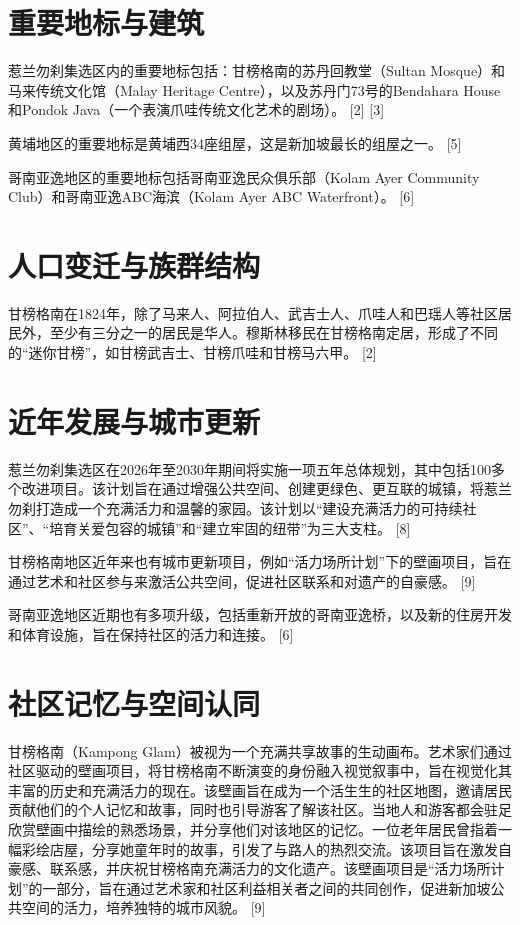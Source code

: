 \documentclass[11pt,a4paper,twoside,openany]{book}
\begin{document}
\section{重要地标与建筑}
惹兰勿刹集选区内的重要地标包括：甘榜格南的苏丹回教堂（Sultan Mosque）和马来传统文化馆（Malay Heritage Centre），以及苏丹门73号的Bendahara House和Pondok Java（一个表演爪哇传统文化艺术的剧场）。 [2] [3]

黄埔地区的重要地标是黄埔西34座组屋，这是新加坡最长的组屋之一。 [5]

哥南亚逸地区的重要地标包括哥南亚逸民众俱乐部（Kolam Ayer Community Club）和哥南亚逸ABC海滨（Kolam Ayer ABC Waterfront）。 [6]

\section{人口变迁与族群结构}
甘榜格南在1824年，除了马来人、阿拉伯人、武吉士人、爪哇人和巴瑶人等社区居民外，至少有三分之一的居民是华人。穆斯林移民在甘榜格南定居，形成了不同的“迷你甘榜”，如甘榜武吉士、甘榜爪哇和甘榜马六甲。 [2]

\section{近年发展与城市更新}
惹兰勿刹集选区在2026年至2030年期间将实施一项五年总体规划，其中包括100多个改进项目。该计划旨在通过增强公共空间、创建更绿色、更互联的城镇，将惹兰勿刹打造成一个充满活力和温馨的家园。该计划以“建设充满活力的可持续社区”、“培育关爱包容的城镇”和“建立牢固的纽带”为三大支柱。 [8]

甘榜格南地区近年来也有城市更新项目，例如“活力场所计划”下的壁画项目，旨在通过艺术和社区参与来激活公共空间，促进社区联系和对遗产的自豪感。 [9]

哥南亚逸地区近期也有多项升级，包括重新开放的哥南亚逸桥，以及新的住房开发和体育设施，旨在保持社区的活力和连接。 [6]

\section{社区记忆与空间认同}
甘榜格南（Kampong Glam）被视为一个充满共享故事的生动画布。艺术家们通过社区驱动的壁画项目，将甘榜格南不断演变的身份融入视觉叙事中，旨在视觉化其丰富的历史和充满活力的现在。该壁画旨在成为一个活生生的社区地图，邀请居民贡献他们的个人记忆和故事，同时也引导游客了解该社区。当地人和游客都会驻足欣赏壁画中描绘的熟悉场景，并分享他们对该地区的记忆。一位老年居民曾指着一幅彩绘店屋，分享她童年时的故事，引发了与路人的热烈交流。该项目旨在激发自豪感、联系感，并庆祝甘榜格南充满活力的文化遗产。该壁画项目是“活力场所计划”的一部分，旨在通过艺术家和社区利益相关者之间的共同创作，促进新加坡公共空间的活力，培养独特的城市风貌。 [9]
\end{document}
